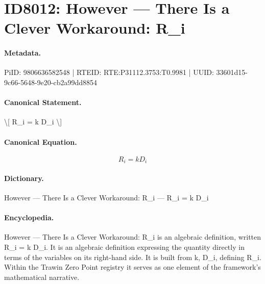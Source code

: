 \section*{ID8012: However — There Is a Clever Workaround: R\_i}
\paragraph{Metadata.}
PiID: 9806636582548 | RTEID: RTE:P31112.3753:T0.9981 | UUID: 33601d15-9c66-5648-9e20-cb2a99dd8854

\paragraph{Canonical Statement.}
\textbackslash{}[ R\_i = k D\_i \textbackslash{}]

\paragraph{Canonical Equation.}
\[
R_i = k D_i
\]

\paragraph{Dictionary.}
However — There Is a Clever Workaround: R\_i — R\_i = k D\_i

\paragraph{Encyclopedia.}
However — There Is a Clever Workaround: R\_i is an algebraic definition, written R\_i = k D\_i. It is an algebraic definition expressing the quantity directly in terms of the variables on its right-hand side. It is built from k, D\_i, defining R\_i. Within the Trawin Zero Point registry it serves as one element of the framework's mathematical narrative.
